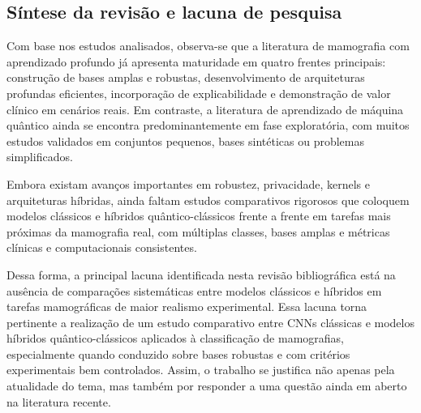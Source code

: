 \subsection{Síntese da revisão e lacuna de pesquisa}

Com base nos estudos analisados, observa-se que a literatura de mamografia com aprendizado profundo já apresenta maturidade em quatro frentes principais: construção de bases amplas e robustas, desenvolvimento de arquiteturas profundas eficientes, incorporação de explicabilidade e demonstração de valor clínico em cenários reais. Em contraste, a literatura de aprendizado de máquina quântico ainda se encontra predominantemente em fase exploratória, com muitos estudos validados em conjuntos pequenos, bases sintéticas ou problemas simplificados.

Embora existam avanços importantes em robustez, privacidade, kernels e arquiteturas híbridas, ainda faltam estudos comparativos rigorosos que coloquem modelos clássicos e híbridos quântico-clássicos frente a frente em tarefas mais próximas da mamografia real, com múltiplas classes, bases amplas e métricas clínicas e computacionais consistentes.

Dessa forma, a principal lacuna identificada nesta revisão bibliográfica está na ausência de comparações sistemáticas entre modelos clássicos e híbridos em tarefas mamográficas de maior realismo experimental. Essa lacuna torna pertinente a realização de um estudo comparativo entre CNNs clássicas e modelos híbridos quântico-clássicos aplicados à classificação de mamografias, especialmente quando conduzido sobre bases robustas e com critérios experimentais bem controlados. Assim, o trabalho se justifica não apenas pela atualidade do tema, mas também por responder a uma questão ainda em aberto na literatura recente.
